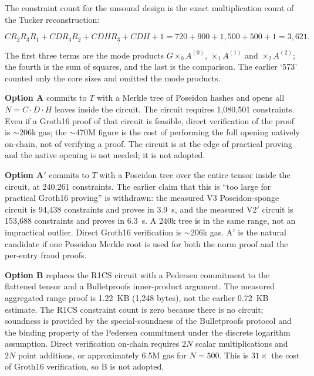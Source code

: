 \documentclass[11pt,a4paper]{article}
\numberwithin{equation}{section}
\numberwithin{table}{section}
\begin{document}
The constraint count for the unsound design is the exact multiplication count of the Tucker reconstruction:

\begin{equation}
C R_2 R_3 R_1 + C D R_3 R_2 + C D H R_3 + C D H + 1
= 720 + 900 + 1{,}500 + 500 + 1 = 3{,}621.
\label{eq:constraints}
\end{equation}

The first three terms are the mode products $G \times_0 A^{(0)}$, $\times_1 A^{(1)}$ and $\times_2 A^{(2)}$; the fourth is the sum of squares, and the last is the comparison. The earlier `573' counted only the core sizes and omitted the mode products.

\textbf{Option A} commits to $T$ with a Merkle tree of Poseidon hashes and opens all $N = C \cdot D \cdot H$ leaves inside the circuit. The circuit requires 1{,}080{,}501 constraints. Even if a Groth16 proof of that circuit is feasible, direct verification of the proof is $\sim$206k gas; the $\sim$470M figure is the cost of performing the full opening natively on-chain, not of verifying a proof. The circuit is at the edge of practical proving and the native opening is not needed; it is not adopted.

\textbf{Option A$'$} commits to $T$ with a Poseidon tree over the entire tensor inside the circuit, at 240{,}261 constraints. The earlier claim that this is ``too large for practical Groth16 proving'' is withdrawn: the measured V3 Poseidon-sponge circuit is 94{,}438 constraints and proves in 3.9~s, and the measured V2$'$ circuit is 153{,}688 constraints and proves in 6.3~s. A 240k tree is in the same range, not an impractical outlier. Direct Groth16 verification is $\sim$206k gas. A$'$ is the natural candidate if one Poseidon Merkle root is used for both the norm proof and the per-entry fraud proofs.

\textbf{Option B} replaces the R1CS circuit with a Pedersen commitment to the flattened tensor and a Bulletproofs inner-product argument. The measured aggregated range proof is 1.22~KB (1,248 bytes), not the earlier 0.72~KB estimate. The R1CS constraint count is zero because there is no circuit; soundness is provided by the special-soundness of the Bulletproofs protocol and the binding property of the Pedersen commitment under the discrete logarithm assumption. Direct verification on-chain requires $2N$ scalar multiplications and $2N$ point additions, or approximately 6.5M gas for $N = 500$. This is $31\times$ the cost of Groth16 verification, so B is not adopted.
\end{document}
